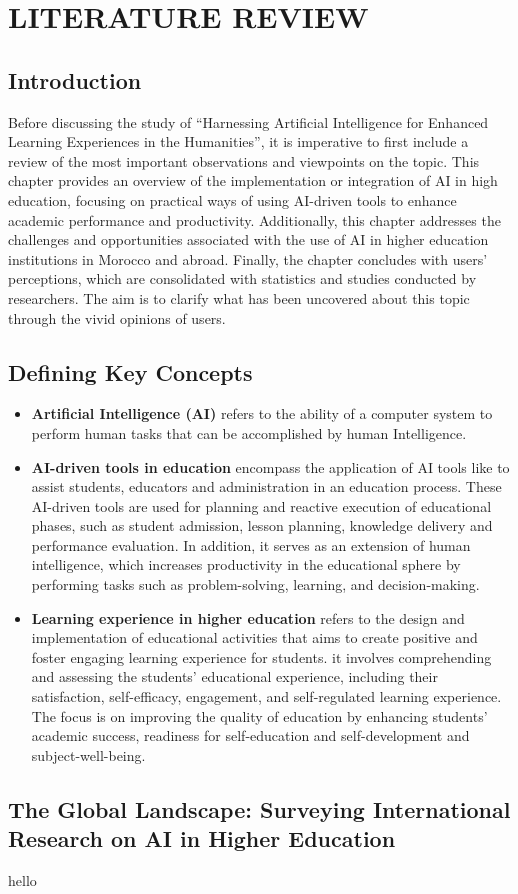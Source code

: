\chapter{LITERATURE REVIEW}\label{ch:literature-review}
\section{Introduction}\label{sec:introduction}
\justifying
Before discussing the study of ``Harnessing Artificial Intelligence for Enhanced
Learning Experiences in the Humanities'', it is imperative to first include a review of the most
important observations and viewpoints on the topic.
This chapter provides an overview of
the implementation or integration of AI in high education, focusing on practical ways of using AI-driven tools
to enhance academic performance and productivity.
Additionally,
this chapter addresses the challenges and opportunities associated with the use of AI in higher education
institutions in Morocco and abroad.
Finally, the chapter concludes with users' perceptions, which are consolidated with
statistics and studies conducted by researchers.
The aim is to clarify
what has been uncovered about this topic through the vivid opinions of users.

\section{Defining Key Concepts}\label{sec:defining-key-concepts}
\begin{itemize}
	\item \textbf{Artificial Intelligence (AI)}\label{AI} refers to the ability of a computer system to perform human
	tasks that can be accomplished by human Intelligence\citep{sadiku_ai_2021}.
	\item \textbf{AI-driven tools in education} encompass the application of AI tools like  to assist 
	students, educators and administration in an education process.
	These AI-driven tools are used for planning and reactive execution of educational phases, such as
	student admission, lesson planning, knowledge delivery and performance evaluation\citep{mallik_proactive_2023}.
	In addition, it serves as an extension of human intelligence, which
	increases productivity in the educational sphere by performing tasks
	such as problem-solving, learning, and decision-making\citep{cheng_widespread_2023}.
	\item \textbf{Learning experience in higher education} refers to the design
	and implementation of educational activities that aims to create positive and foster engaging learning experience for students\citep{kang_supporting_2023}.
	it involves comprehending and assessing the students' educational experience, including
	their satisfaction, self-efficacy, engagement, and self-regulated learning experience\citep{lyz_students_2022}.
	The focus is on improving the quality of education by enhancing students' academic success, readiness for self-education and self-development
	and subject-well-being\citep{iordache-platis_building_2018}.
\end{itemize}
\section{The Global Landscape: Surveying International Research on AI in Higher Education}\label{ai-in-world}
hello
